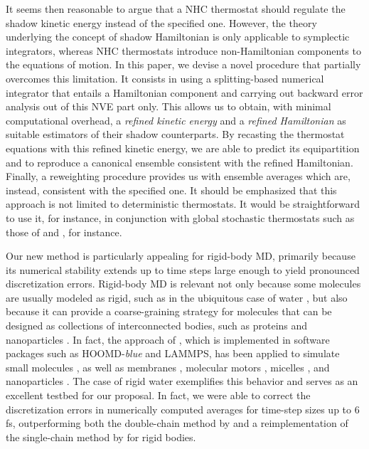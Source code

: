 \documentclass[
journal=jctcce,
layout=twocolumn
]{achemso}
\begin{document}
It seems then reasonable to argue that a NHC thermostat should regulate the shadow kinetic energy instead of the specified one.
However, the theory underlying the concept of shadow Hamiltonian is only applicable to symplectic integrators, whereas NHC thermostats introduce non-Hamiltonian components to the equations of motion.
In this paper, we devise a novel procedure that partially overcomes this limitation.
It consists in using a splitting-based numerical integrator that entails a Hamiltonian component and carrying out backward error analysis out of this NVE part only.
This allows us to obtain, with minimal computational overhead, a \textit{refined kinetic energy} and a \textit{refined Hamiltonian} as suitable estimators of their shadow counterparts.
By recasting the thermostat equations with this refined kinetic energy, we are able to predict its equipartition and to reproduce a canonical ensemble consistent with the refined Hamiltonian.
Finally, a reweighting procedure provides us with ensemble averages which are, instead, consistent with the specified one. It should be emphasized that this approach is not limited to deterministic thermostats. It would be straightforward to use it, for instance, in conjunction with global stochastic thermostats such as those of \citeauthor{Bussi_2007} \cite{Bussi_2007} and \citeauthor{Leimkuhler_2009} \cite{Leimkuhler_2009}, for instance.

Our new method is particularly appealing for rigid-body MD, primarily because its numerical stability extends up to time steps large enough to yield pronounced discretization errors. Rigid-body MD is relevant not only because some molecules are usually modeled as rigid, such as in the ubiquitous case of water \cite{Jorgensen_1983}, but also because it can provide a coarse-graining strategy for molecules that can be designed as collections of interconnected bodies, such as proteins and nanoparticles \cite{Miller_2002, Knorowski_2012, Patra_2013}.
In fact, the approach of \citeauthor{Kamberaj_2005} \cite{Kamberaj_2005}, which is implemented in software packages such as HOOMD-\textit{blue}\cite{Anderson_2008} and LAMMPS\cite{Plimpton_1995}, has been applied to simulate small molecules \cite{Geiger_2013, Aimoli_2014, Aimoli_2014_2}, as well as membranes \cite{Bucior_2012}, molecular motors \cite{Akimov_2012}, micelles \cite{Yan_2008}, and nanoparticles \cite{Patra_2014}.
The case of rigid water exemplifies this behavior and serves as an excellent testbed for our proposal.
In fact, we were able to correct the discretization errors in numerically computed averages for time-step sizes up to 6 fs, outperforming both the double-chain method by \citeauthor{Kamberaj_2005} \cite{Kamberaj_2005} and a reimplementation of the single-chain method by \citeauthor{Martyna_1996} \cite{Martyna_1996} for rigid bodies.
\end{document}
